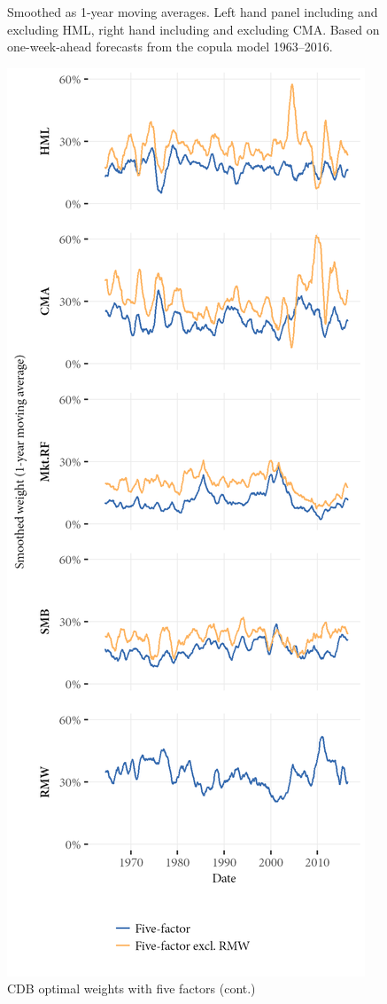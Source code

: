\begin{figure}[htbp]
  \begin{longcaption}
    Smoothed as 1-year moving averages. Left hand panel including and excluding HML, right hand including and excluding CMA. Based on one-week-ahead forecasts from the copula model 1963--2016.
  \end{longcaption}
\end{figure}

\begin{figure}[htbp]
  \ContinuedFloat
  \centering
  \includegraphics[scale=1]{graphics/weights/appendix_Weights_CDB_5F_5F_EXCL_RMW.png}
  \footnotesize
  \caption{CDB optimal weights with five factors (cont.)}
\end{figure}

